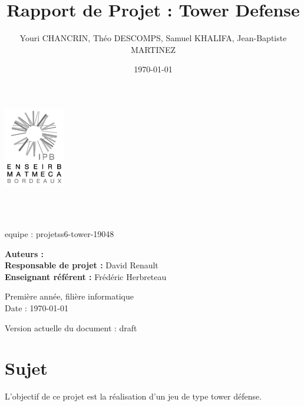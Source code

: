 \documentclass{article}
\title{Rapport de Projet : Tower Defense}
\author{Youri CHANCRIN, Théo DESCOMPS, Samuel KHALIFA, Jean-Baptiste MARTINEZ}
\date{\today}
\makeatletter
\let\mytitle\@title
\let\myauthor\@author
\makeatother
\begin{document}
\begin{flushleft}

\thispagestyle{empty}
\includegraphics[width=0.2\textwidth]{enseirb-matmeca}
\graphicspath{{./img/}}


\hrulefill \\[2em]
\begin{center}
\textbf{\Huge \mytitle}\\[0.8em]
{\large equipe : projetss6-tower-19048}
\\[0.8em]
\end{center}
\hrulefill


{\large \textbf{Auteurs :} \myauthor}\\
{\large \textbf{Responsable de projet :} David Renault}\\
{\large \textbf{Enseignant référent :} Frédéric Herbreteau}


\begin{center}
  Première année, filière informatique\\
  Date : \today
\end{center}


\hfill Version actuelle du document : draft

\end{flushleft}

\newpage

\tableofcontents

\newpage

\section{Sujet}
L'objectif de ce projet est la réalisation d'un jeu de type tower défense.
\end{document}
